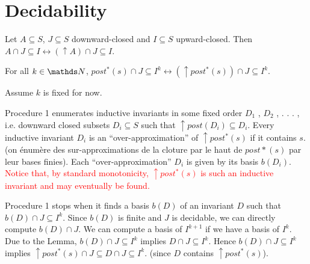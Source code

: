 
\section{Decidability}



\begin{lemma}
Let $A \subseteq S$, $J \subseteq S$ downward-closed and $I \subseteq S$ upward-closed. 
Then $A \cap J \subseteq I \leftrightarrow (\uparrow  A) \cap J \subseteq I$.
\end{lemma}


\begin{corollary}
For all $k \in \N$,
$ post^*(s)\cap J \subseteq I^k \leftrightarrow (\uparrow  post^*(s)) \cap J \subseteq I^k$. 
\end{corollary}




Assume $k$ is fixed for now.

Procedure 1 enumerates inductive invariants in some fixed order $D_1$ , $D_2$ , . . . , i.e. downward closed subsets $D_i \subseteq S$ such that $\uparrow post(D_i ) \subseteq D_i$. 
Every inductive invariant $D_i$ is an “over-approximation” of $\uparrow post^*(s)$ if it contains $s$.
(on énumère des sur-approximations de la cloture par le haut de $post*(s)$ par leur bases finies).
Each “over-approximation” $D_i$ is given by its basis $b(D_i)$. \textcolor{red}{Notice that, by standard monotonicity, $\uparrow post^*(s)$ is such an inductive invariant and may
eventually be found.}

Procedure 1 stops when it finds a basis $b(D)$ of an invariant $D$ such that
$b(D)  \cap J \subseteq I^k$.  Since $b(D)$ is finite and $J$ is decidable, we can
directly compute $b(D)  \cap J$.
We can compute a basis
of $I^{k+1}$ if we have a basis of $I^k$. %
Due to the Lemma, 
$b(D)  \cap J \subseteq I^k$ implies
$D  \cap J \subseteq I^k$.
Hence
$b(D)  \cap J \subseteq I^k$ implies
$\uparrow post^*(s) \cap J \subseteq D  \cap J \subseteq I^k$.
(since $D$ contains $ \uparrow post^*(s)$).



